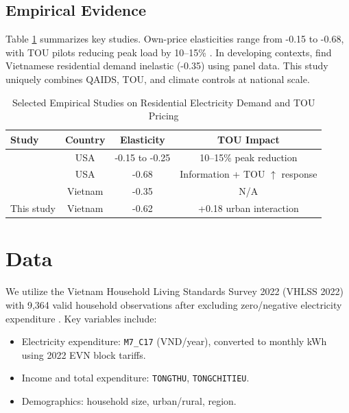 \documentclass[12pt,a4paper]{article}
\begin{document}
	\subsection{Empirical Evidence}
	Table \ref{tab:litreview} summarizes key studies. Own-price elasticities range from -0.15 to -0.68, with TOU pilots reducing peak load by 10--15\% \citep{faruqui2010, jessoe2014}. In developing contexts, \citet{le2020} find Vietnamese residential demand inelastic (-0.35) using panel data. This study uniquely combines QAIDS, TOU, and climate controls at national scale.
	
	\begin{table}[htbp]
		\caption{Selected Empirical Studies on Residential Electricity Demand and TOU Pricing}
		\label{tab:litreview}
		\centering
		\begin{tabular}{lccc}
			\toprule
			Study & Country & Elasticity & TOU Impact \\
			\midrule
			\citet{faruqui2010} & USA & -0.15 to -0.25 & 10--15\% peak reduction \\
			\citet{jessoe2014} & USA & -0.68 & Information + TOU $\uparrow$ response \\
			\citet{le2020} & Vietnam & -0.35 & N/A \\
			This study & Vietnam & -0.62 & +0.18 urban interaction \\
			\bottomrule
		\end{tabular}
	\end{table}
	
	\section{Data}
	We utilize the Vietnam Household Living Standards Survey 2022 (VHLSS 2022) with 9,364 valid household observations after excluding zero/negative electricity expenditure \citep{worldbank2023}. Key variables include:
	\begin{itemize}
		\item Electricity expenditure: \texttt{M7\_C17} (VND/year), converted to monthly kWh using 2022 EVN block tariffs.
		\item Income and total expenditure: \texttt{TONGTHU}, \texttt{TONGCHITIEU}.
		\item Demographics: household size, urban/rural, region.
	\end{itemize}
	
\end{document}
